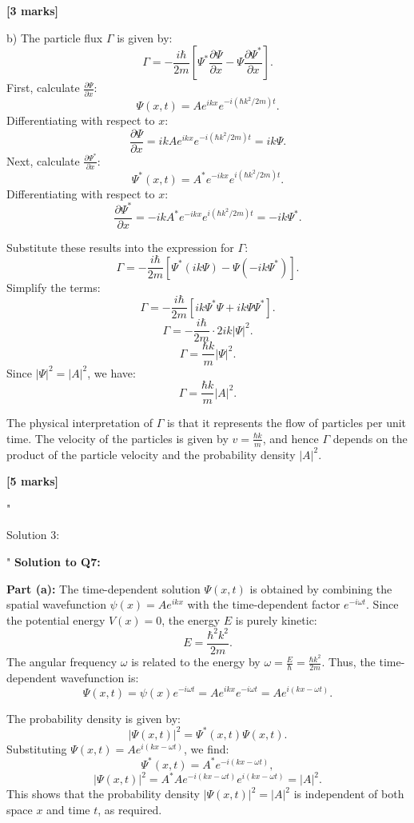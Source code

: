 \textbf{[3 marks]}

b) The particle flux $\Gamma$ is given by:
\[
\Gamma = -\frac{i \hbar}{2m} \left[ \Psi^* \frac{\partial \Psi}{\partial x} - \Psi \frac{\partial \Psi^*}{\partial x} \right].
\]
First, calculate $\frac{\partial \Psi}{\partial x}$:
\[
\Psi(x,t) = A e^{ikx} e^{-i(\hbar k^2 / 2m)t}.
\]
Differentiating with respect to $x$:
\[
\frac{\partial \Psi}{\partial x} = ik A e^{ikx} e^{-i(\hbar k^2 / 2m)t} = ik \Psi.
\]
Next, calculate $\frac{\partial \Psi^*}{\partial x}$:
\[
\Psi^*(x,t) = A^* e^{-ikx} e^{i(\hbar k^2 / 2m)t}.
\]
Differentiating with respect to $x$:
\[
\frac{\partial \Psi^*}{\partial x} = -ik A^* e^{-ikx} e^{i(\hbar k^2 / 2m)t} = -ik \Psi^*.
\]

Substitute these results into the expression for $\Gamma$:
\[
\Gamma = -\frac{i \hbar}{2m} \left[ \Psi^* (ik\Psi) - \Psi (-ik\Psi^*) \right].
\]
Simplify the terms:
\[
\Gamma = -\frac{i \hbar}{2m} \left[ i k \Psi^* \Psi + i k \Psi \Psi^* \right].
\]
\[
\Gamma = -\frac{i \hbar}{2m} \cdot 2i k |\Psi|^2.
\]
\[
\Gamma = \frac{\hbar k}{m} |\Psi|^2.
\]
Since $|\Psi|^2 = |A|^2$, we have:
\[
\Gamma = \frac{\hbar k}{m} |A|^2.
\]

The physical interpretation of $\Gamma$ is that it represents the flow of particles per unit time. The velocity of the particles is given by $v = \frac{\hbar k}{m}$, and hence $\Gamma$ depends on the product of the particle velocity and the probability density $|A|^2$.

\textbf{[5 marks]}

"

Solution 3:

"
\textbf{Solution to Q7:}

\textbf{Part (a):}  
The time-dependent solution $\Psi(x,t)$ is obtained by combining the spatial wavefunction $\psi(x) = A e^{ikx}$ with the time-dependent factor $e^{-i\omega t}$. Since the potential energy $V(x) = 0$, the energy $E$ is purely kinetic:  
\[
E = \frac{\hbar^2 k^2}{2m}.
\]  
The angular frequency $\omega$ is related to the energy by $\omega = \frac{E}{\hbar} = \frac{\hbar k^2}{2m}$. Thus, the time-dependent wavefunction is:  
\[
\Psi(x,t) = \psi(x)e^{-i\omega t} = A e^{ikx} e^{-i\omega t} = A e^{i(kx - \omega t)}.
\]

The probability density is given by:  
\[
|\Psi(x,t)|^2 = \Psi^*(x,t)\Psi(x,t).
\]  
Substituting $\Psi(x,t) = A e^{i(kx - \omega t)}$, we find:  
\[
\Psi^*(x,t) = A^* e^{-i(kx - \omega t)},
\]
\[
|\Psi(x,t)|^2 = A^*A e^{-i(kx - \omega t)}e^{i(kx - \omega t)} = |A|^2.
\]
This shows that the probability density $|\Psi(x,t)|^2 = |A|^2$ is independent of both space $x$ and time $t$, as required.

